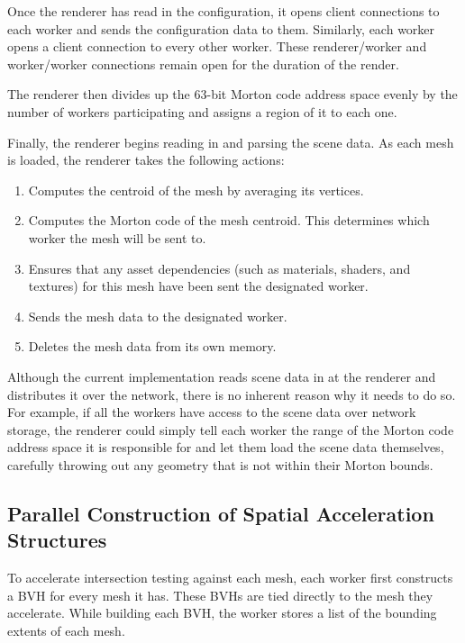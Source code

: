\documentclass[12pt]{ucthesis}
\begin{document}
Once the renderer has read in the configuration, it opens client connections
to each worker and sends the configuration data to them. Similarly, each worker
opens a client connection to every other worker. These renderer/worker and
worker/worker connections remain open for the duration of the render.

The renderer then divides up the 63-bit Morton code address space evenly by the
number of workers participating and assigns a region of it to each one.

Finally, the renderer begins reading in and parsing the scene data. As each mesh
is loaded, the renderer takes the following actions:

\begin{enumerate}
   \item Computes the centroid of the mesh by averaging its vertices.
   \item Computes the Morton code of the mesh centroid. This determines
      which worker the mesh will be sent to.
   \item Ensures that any asset dependencies (such as materials,
      shaders, and textures) for this mesh have been sent the designated worker.
   \item Sends the mesh data to the designated worker.
   \item Deletes the mesh data from its own memory.
\end{enumerate}

Although the current implementation reads scene data in at the renderer
and distributes it over the network, there is no inherent reason why it needs to
do so. For example, if all the workers have access to the scene data over network
storage, the renderer could simply tell each worker the range of the Morton code
address space it is responsible for and let them load the scene data themselves,
carefully throwing out any geometry that is not within their Morton bounds.

\subsection{Parallel Construction of Spatial Acceleration Structures}
\label{parallelbvh}

To accelerate intersection testing against each mesh, each worker first
constructs a BVH for every mesh it has. These BVHs are tied directly to the mesh
they accelerate. While building each BVH, the worker stores a list of the bounding
extents of each mesh.
\end{document}
